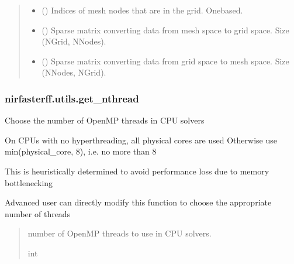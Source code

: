\documentclass[letterpaper,10pt,english]{sphinxmanual}
\begin{document}
\begin{fulllineitems}
\begin{quote}
\begin{description}
\begin{itemize}
\item {} 
\sphinxAtStartPar
{} () \textendash{} Indices of mesh nodes that are in the grid. One\sphinxhyphen{}based.

\item {} 
\sphinxAtStartPar
{} () \textendash{} Sparse matrix converting data from mesh space to grid space. Size (NGrid, NNodes).

\item {} 
\sphinxAtStartPar
{} () \textendash{} Sparse matrix converting data from grid space to mesh space. Size (NNodes, NGrid).

\end{itemize}


\end{description}\end{quote}

\end{fulllineitems}


\sphinxstepscope


\subsubsection{nirfasterff.utils.get\_nthread}
\label{\detokenize{_autosummary/nirfasterff.utils.get_nthread:nirfasterff-utils-get-nthread}}\label{\detokenize{_autosummary/nirfasterff.utils.get_nthread::doc}}

\begin{fulllineitems}
\label{\detokenize{_autosummary/nirfasterff.utils.get_nthread:nirfasterff.utils.get_nthread}}
\pysigstartsignatures
{}
\pysigstopsignatures
\sphinxAtStartPar
Choose the number of OpenMP threads in CPU solvers

\sphinxAtStartPar
On CPUs with no hyperthreading, all physical cores are used
Otherwise use min(physical\_core, 8), i.e. no more than 8

\sphinxAtStartPar
This is heuristically determined to avoid performance loss due to memory bottlenecking

\sphinxAtStartPar
Advanced user can directly modify this function to choose the appropriate number of threads
\begin{quote}\begin{description}
\sphinxAtStartPar
{} \textendash{} number of OpenMP threads to use in CPU solvers.

\sphinxAtStartPar
int

\end{description}\end{quote}

\end{fulllineitems}
\end{document}
